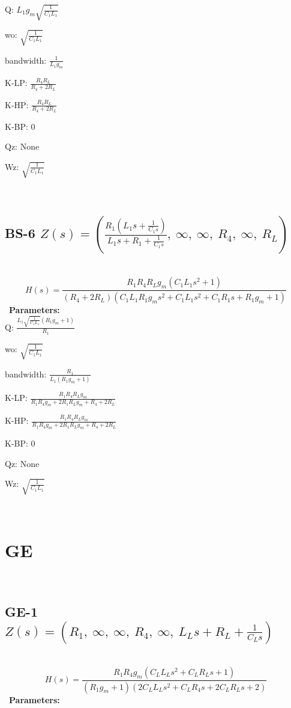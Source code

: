 \documentclass{article}
\begin{document}
Q: $L_{1} g_{m} \sqrt{\frac{1}{C_{1} L_{1}}}$\ 

wo: $\sqrt{\frac{1}{C_{1} L_{1}}}$\ 

bandwidth: $\frac{1}{L_{1} g_{m}}$\ 

K-LP: $\frac{R_{4} R_{L}}{R_{4} + 2 R_{L}}$\ 

K-HP: $\frac{R_{4} R_{L}}{R_{4} + 2 R_{L}}$\ 

K-BP: $0$\ 

Qz: $\text{None}$\ 

Wz: $\sqrt{\frac{1}{C_{1} L_{1}}}$\ 

\ 

\subsection{BS-6 $Z(s) = \left( \frac{R_{1} \left(L_{1} s + \frac{1}{C_{1} s}\right)}{L_{1} s + R_{1} + \frac{1}{C_{1} s}}, \  \infty, \  \infty, \  R_{4}, \  \infty, \  R_{L}\right)$ } \ 
\textbf{\[H(s) = \frac{R_{1} R_{4} R_{L} g_{m} \left(C_{1} L_{1} s^{2} + 1\right)}{\left(R_{4} + 2 R_{L}\right) \left(C_{1} L_{1} R_{1} g_{m} s^{2} + C_{1} L_{1} s^{2} + C_{1} R_{1} s + R_{1} g_{m} + 1\right)}\] } \ 
\textbf{Parameters:}\\ 

Q: $\frac{L_{1} \sqrt{\frac{1}{C_{1} L_{1}}} \left(R_{1} g_{m} + 1\right)}{R_{1}}$\ 

wo: $\sqrt{\frac{1}{C_{1} L_{1}}}$\ 

bandwidth: $\frac{R_{1}}{L_{1} \left(R_{1} g_{m} + 1\right)}$\ 

K-LP: $\frac{R_{1} R_{4} R_{L} g_{m}}{R_{1} R_{4} g_{m} + 2 R_{1} R_{L} g_{m} + R_{4} + 2 R_{L}}$\ 

K-HP: $\frac{R_{1} R_{4} R_{L} g_{m}}{R_{1} R_{4} g_{m} + 2 R_{1} R_{L} g_{m} + R_{4} + 2 R_{L}}$\ 

K-BP: $0$\ 

Qz: $\text{None}$\ 

Wz: $\sqrt{\frac{1}{C_{1} L_{1}}}$\ 

\ 

\section{GE}\ 
\subsection{GE-1 $Z(s) = \left( R_{1}, \  \infty, \  \infty, \  R_{4}, \  \infty, \  L_{L} s + R_{L} + \frac{1}{C_{L} s}\right)$ } \ 
\textbf{\[H(s) = \frac{R_{1} R_{4} g_{m} \left(C_{L} L_{L} s^{2} + C_{L} R_{L} s + 1\right)}{\left(R_{1} g_{m} + 1\right) \left(2 C_{L} L_{L} s^{2} + C_{L} R_{4} s + 2 C_{L} R_{L} s + 2\right)}\] } \ 
\textbf{Parameters:}\\ 
\end{document}
